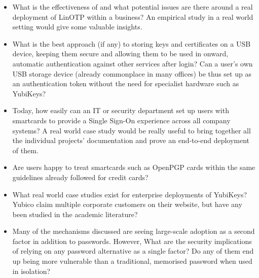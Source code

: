 \documentclass{report}
\begin{document}
\begin{itemize}
\item What is the effectiveness of and what potential issues are there around
  a real deployment of LinOTP within a business? An empirical study in a
  real world setting would give some valuable insights.
\item What is the best approach (if any) to storing keys and certificates on
  a USB device, keeping them secure and allowing them to be used in onward,
  automatic authentication against other services after login? Can a user's
  own USB storage device (already commonplace in many offices) be thus set
  up as an authentication token without the need for specialist hardware
  such as YubiKeys?
\item Today, how easily can an IT or security department set up users with
  smartcards to provide a Single Sign-On experience across all company
  systems? A real world case study would be really useful to bring together
  all the individual projects' documentation and prove an end-to-end deployment
  of them.
\item Are users happy to treat smartcards such as OpenPGP cards within the
  same guidelines already followed for credit cards?
\item What real world case studies exist for enterprise deployments of YubiKeys?
  Yubico claim multiple corporate customers on their website, but have any
  been studied in the academic literature?
\item Many of the mechanisms discussed are seeing large-scale
  adoption as a second factor in addition to passwords. However, What are the
  security implications of relying on any password alternative as a single factor?
  Do any of them end up being more vulnerable than a traditional, memorised
  password when used in isolation?
\end{itemize}

\printbibliography
\end{document}
